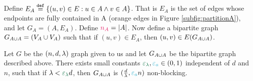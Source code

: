 \documentclass[11pt]{article}
\begin{document}
Define $E_A \text{}\overset{\mathtt{def}}{=} \{ (u,v) \in E : u \in A \land v \in A\}$. 
That is $E_A$ is the set of edges whose endpoints are fully contained in A (orange edges in Figure \ref{subfig:partitionA}), and let $G_A = (A, E_A)$. 
Define $ \na = |A|$.
Now define a bipartite graph $G_{A \cup A} = (V_A \cup V_A)$ such that if $(u,v) \in E_A$, then $(u,v) \in E(G_{A \cup A})$.

\begin{lemma}\label{lemma:bipartitie-is-non-blocking}Let $G$ be the $(n, d, \lambda)$ graph given to us and let $G_{A \cup A}$ be the bipartite graph described above. 
There exists small constants $\epsilonL, \epsilonA  \in (0,1)$ independent of $d$ and $n$, such that if $\lambda < \epsilonL d$, then $G_{A \cup A}$ is $(\frac{d}{\lambda}, \epsilonA n)$ non-blocking.
\end{lemma}
\end{document}
